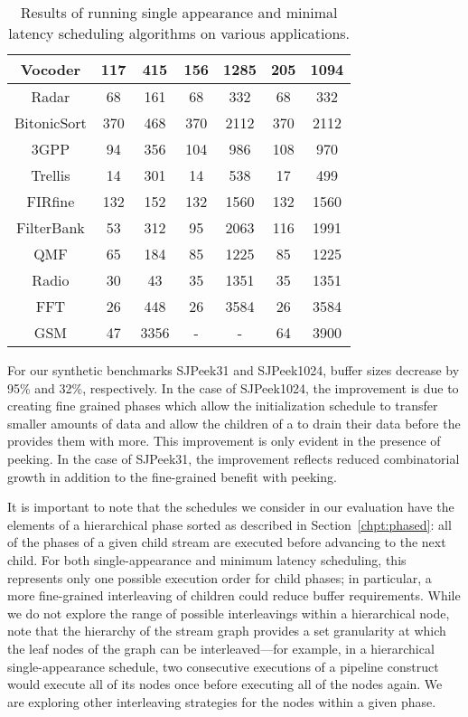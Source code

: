 \documentclass{sig-alt-full}
\begin{document}
\begin{table*}
\begin{tabular}{|c|c|c|c|c|c|c|}
\hline Vocoder & 117 & 415 & 156 & 1285 & 205 & 1094 \\
\hline Radar & 68 & 161 & 68 & 332 & 68 & 332 \\
\hline BitonicSort & 370 & 468 & 370 & 2112 & 370 & 2112 \\
\hline 3GPP & 94 & 356 & 104 & 986 & 108 & 970 \\
\hline Trellis & 14 & 301 & 14 & 538 & 17 & 499 \\
\hline FIRfine & 132 & 152 & 132 & 1560 & 132 & 1560 \\
\hline FilterBank & 53 & 312 & 95 & 2063 & 116 & 1991 \\
\hline QMF & 65 & 184 & 85 & 1225 & 85 & 1225 \\
\hline Radio & 30 & 43 & 35 & 1351 & 35 & 1351 \\
\hline FFT & 26 & 448 & 26 & 3584 & 26 & 3584 \\
\hline GSM & 47 & 3356 & - & - & 64 & 3900 \\
\hline
\end{tabular}
\caption{\small Results of running single appearance and minimal
latency scheduling algorithms on various applications.}
\label{tbl:results}
\vspace{-4pt}
\end{table*}

For our synthetic benchmarks SJPeek31 and SJPeek1024, buffer sizes
decrease by 95\% and 32\%, respectively. In the case of SJPeek1024,
the improvement is due to creating fine grained phases which allow the
initialization schedule to transfer smaller amounts of data and allow
the children of a {\splitjoin} to drain their data before the
{\splitter} provides them with more. This improvement is only evident
in the presence of peeking. In the case of SJPeek31, the improvement
reflects reduced combinatorial growth in addition to the fine-grained
benefit with peeking.

It is important to note that the schedules we consider in our
evaluation have the elements of a hierarchical phase sorted as
described in Section~\ref{chpt:phased}: all of the phases of a given
child stream are executed before advancing to the next child.  For
both single-appearance and minimum latency scheduling, this represents
only one possible execution order for child phases; in particular, a
more fine-grained interleaving of children could reduce buffer
requirements.  While we do not explore the range of possible
interleavings within a hierarchical node, note that the hierarchy of
the stream graph provides a set granularity at which the leaf nodes of
the graph can be interleaved---for example, in a hierarchical
single-appearance schedule, two consecutive executions of a pipeline
construct would execute all of its nodes once before executing all of
the nodes again.  We are exploring other interleaving strategies for
the nodes within a given phase.
\end{document}

